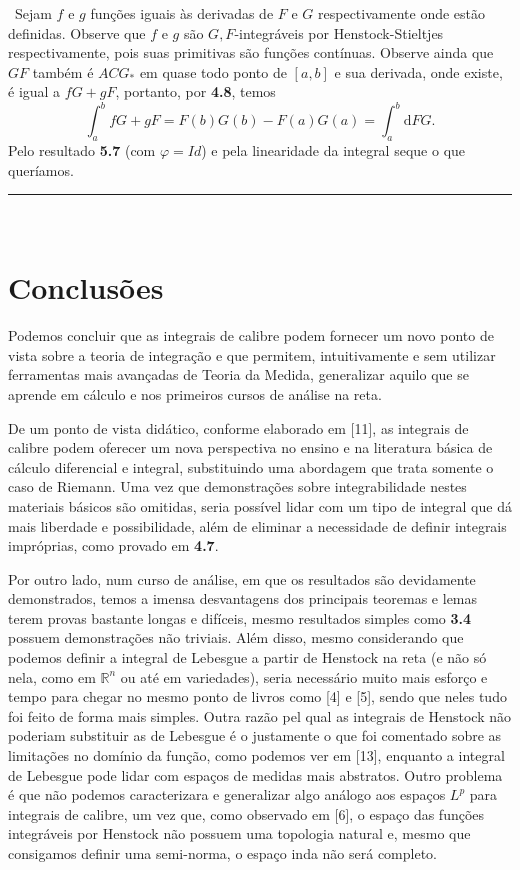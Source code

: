 \documentclass[12pt, a4paper]{article}
\def\dem{\par\smallbreak\noindent {\textit{ Demonstração:}} \ }
\def\eop{\hfill\rule{2.5mm}{2.5mm}}
\theoremstyle{definition}
\begin{document}
\dem Sejam $f$ e $g$ funções iguais às derivadas de $F$ e $G$ respectivamente onde estão definidas. Observe que $f$ e $g$ são $G,F$-integráveis por Henstock-Stieltjes respectivamente, pois suas primitivas são funções contínuas. Observe ainda que $GF$ também é $ACG_*$ em quase todo ponto de $[a,b]$ e sua derivada, onde existe, é igual a $fG+gF$, portanto, por \textbf{4.8}, temos $$\int_a^b fG+gF=F(b)G(b) - F(a)G(a)= \int_a^b  \text{d}FG.$$ Pelo resultado \textbf{5.7} (com $\varphi=Id$) e pela linearidade da integral seque o que queríamos. \eop \\ 



\section{Conclusões}

Podemos concluir que as integrais de calibre podem fornecer um novo ponto de vista sobre a teoria de integração e que permitem, intuitivamente e sem utilizar ferramentas mais avançadas de Teoria da Medida, generalizar aquilo que se aprende em cálculo e nos primeiros cursos de análise na reta.

De um ponto de vista didático, conforme elaborado em [11], as integrais de calibre podem oferecer um nova perspectiva no ensino e na literatura básica de cálculo diferencial e integral, substituindo uma abordagem que trata somente o caso de Riemann. Uma vez que demonstrações sobre integrabilidade nestes materiais básicos são omitidas, seria possível lidar com um tipo de integral que dá mais liberdade e possibilidade, além de eliminar a necessidade de definir integrais impróprias, como provado em \textbf{4.7}. 

Por outro lado, num curso de análise, em que os resultados são devidamente demonstrados, temos a imensa desvantagens dos principais teoremas e lemas terem provas bastante longas e difíceis, mesmo resultados simples como \textbf{3.4} possuem demonstrações não triviais. Além disso, mesmo considerando que podemos definir a integral de Lebesgue a partir de Henstock na reta (e não só nela, como em $\mathbb{R}^n$ ou até em variedades), seria necessário muito mais esforço e tempo para chegar no mesmo ponto de livros como [4] e [5], sendo que neles tudo foi feito de forma mais simples. Outra razão pel qual as integrais de Henstock não poderiam substituir as de Lebesgue é o justamente o que foi comentado sobre as limitações no domínio da função, como podemos ver em [13], enquanto a integral de Lebesgue pode lidar com espaços de medidas mais abstratos. Outro problema é que não podemos caracterizara e generalizar algo análogo aos espaços $L^p$ para integrais de calibre, um vez que, como observado em [6], o espaço das funções integráveis por Henstock não possuem uma topologia natural e, mesmo que consigamos definir uma semi-norma, o espaço inda não será completo. 
\end{document}
